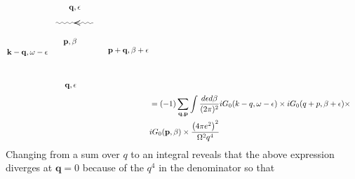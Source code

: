 \begin{equation}
\begin{aligned}
\begin{tikzpicture}[x=0.65pt,y=0.65pt,yscale=-1,xscale=1]
\draw    (157.68,75.38) .. controls (159.35,73.71) and (161.01,73.71) .. (162.68,75.38) .. controls (164.35,77.05) and (166.01,77.05) .. (167.68,75.38) .. controls (169.35,73.71) and (171.01,73.71) .. (172.68,75.38) .. controls (174.35,77.05) and (176.01,77.05) .. (177.68,75.38) .. controls (179.35,73.71) and (181.01,73.71) .. (182.68,75.38) .. controls (184.35,77.05) and (186.01,77.05) .. (187.68,75.38) .. controls (189.35,73.71) and (191.01,73.71) .. (192.68,75.38) .. controls (194.35,77.05) and (196.01,77.05) .. (197.68,75.38) .. controls (199.35,73.71) and (201.01,73.71) .. (202.68,75.38) .. controls (204.35,77.05) and (206.01,77.05) .. (207.68,75.38) .. controls (209.35,73.71) and (211.01,73.71) .. (212.68,75.38) .. controls (214.35,77.05) and (216.01,77.05) .. (217.68,75.38) .. controls (219.35,73.71) and (221.01,73.71) .. (222.68,75.38) .. controls (224.35,77.05) and (226.01,77.05) .. (227.68,75.38) -- (231,75.38) -- (231,75.38) ;
\draw [shift={(194.34,75.38)}, rotate = 0] [color={rgb, 255:red, 0; green, 0; blue, 0 }  ][line width=0.75]    (10.93,-4.9) .. controls (6.95,-2.3) and (3.31,-0.67) .. (0,0) .. controls (3.31,0.67) and (6.95,2.3) .. (10.93,4.9)   ;

\draw (182,41) node [anchor=north west][inner sep=0.75pt]    {$\mathbf{q} ,\epsilon $};
\draw (174,193) node [anchor=north west][inner sep=0.75pt]    {$\mathbf{q} ,\epsilon $};
\draw (61,125) node [anchor=north west][inner sep=0.75pt]    {$\mathbf{k} -\mathbf{q} ,\omega -\epsilon $};
\draw (258,121) node [anchor=north west][inner sep=0.75pt]    {$\mathbf{p} +\mathbf{q} ,\beta +\epsilon $};
\draw (171,104) node [anchor=north west][inner sep=0.75pt]    {$\mathbf{p} ,\beta $};


\end{tikzpicture}\\
&=(-1) \sum_{\mathbf{q,p}} \int \frac{d \epsilon d \beta}{(2 \pi)^{2}} i G_{0}(k-q, \omega-\epsilon) \times i G_{0}(q+p, \beta+\epsilon) \times\\
&i G_{0}(\mathbf{p}, \beta) \times \frac{\left(4 \pi e^{2}\right)^{2}}{\Omega^{2} q^{4}}
    \end{aligned}
\end{equation}
Changing from a sum over $q$ to an integral reveals that the above expression diverges at $\mathbf{q}=0$ because of the $q^{4}$ in the denominator so that
